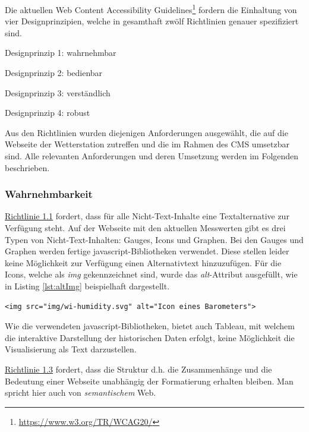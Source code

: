 \noindent
Die aktuellen Web Content Accessibility Guidelines\footnote{\url{https://www.w3.org/TR/WCAG20/}} fordern die Einhaltung von vier Designprinzipien, welche in gesamthaft zwölf Richtlinien genauer spezifiziert sind.

\begin{itemize*}
\item Designprinzip 1: wahrnehmbar
\item Designprinzip 2: bedienbar
\item Designprinzip 3: verständlich
\item Designprinzip 4: robust
\end{itemize*}

\noindent
Aus den Richtlinien wurden diejenigen Anforderungen ausgewählt, die auf die Webseite der Wetterstation zutreffen und die im Rahmen des CMS umsetzbar sind. Alle relevanten Anforderungen und deren Umsetzung werden im Folgenden beschrieben.

\subsubsection{Wahrnehmbarkeit}
\href{https://www.w3.org/Translations/WCAG20-de/#text-equiv}{Richtlinie 1.1} fordert, dass für alle Nicht-Text-Inhalte eine Textalternative zur Verfügung steht. Auf der Webseite mit den aktuellen Messwerten gibt es drei Typen von Nicht-Text-Inhalten: Gauges, Icons und Graphen. Bei den Gauges und Graphen werden fertige javascript-Bibliotheken verwendet. Diese stellen leider keine Möglichkeit zur Verfügung einen Alternativtext hinzuzufügen. Für die Icons, welche als \textit{img} gekennzeichnet sind, wurde das \textit{alt}-Attribut ausgefüllt, wie in Listing \ref{lst:altImg} beispielhaft dargestellt.

\begin{lstlisting}[label=lst:altImg,caption=Alternativtext für Icons, language=HTML5, style=htmlcssjs]
<img src="img/wi-humidity.svg" alt="Icon eines Barometers">
\end{lstlisting}

Wie die verwendeten javascript-Bibliotheken, bietet auch Tableau, mit welchem die interaktive Darstellung der historischen Daten erfolgt, keine Möglichkeit die Visualisierung als Text darzustellen. \newline

\noindent
\href{https://www.w3.org/Translations/WCAG20-de/#text-equiv}{Richtlinie 1.3} fordert, dass die Struktur d.h. die Zusammenhänge und die Bedeutung einer Webseite unabhängig der Formatierung erhalten bleiben. Man spricht hier auch von \textit{semantischem} Web.

